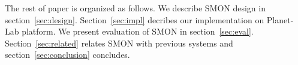 The rest of paper is organized as follows. We describe SMON
design in section~\ref{sec:design}. Section~\ref{sec:impl}
decribes our implementation on Planet-Lab platform. We
present evaluation of SMON in section~\ref{sec:eval}.
Section~\ref{sec:related} relates SMON with previous systems
and section~\ref{sec:conclusion} concludes.


